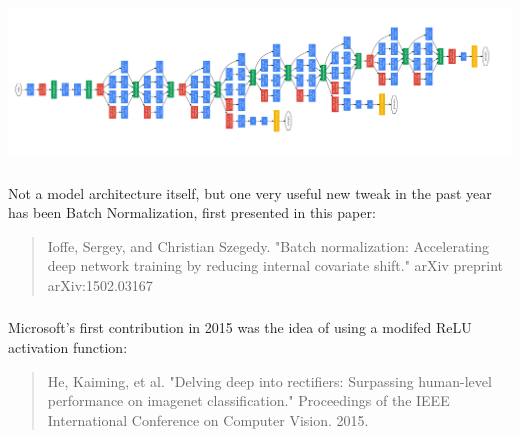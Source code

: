 \documentclass[xetex,mathserif,serif,aspectratio=169]{beamer}
\begin{document}
\begin{frame}[fragile] \frametitle{} \oldB \small

\begin{center}
\includegraphics[width=\textwidth]{img/googlenet_diagram.png}
\end{center}

\end{frame}

\begin{frame}[fragile] \frametitle{} \oldB \small

\textbf{}

\end{frame}

\begin{frame}[fragile] \frametitle{} \oldB \small


Not a model architecture itself, but one very useful new tweak in
the past year has been Batch Normalization, first presented in this
paper:
\begin{quote}
 Ioffe, Sergey, and Christian Szegedy. "Batch normalization: Accelerating deep network training by reducing internal covariate shift." arXiv preprint arXiv:1502.03167
\end{quote}

\end{frame}

\begin{frame}[fragile] \frametitle{} \oldB \small

\textbf{}

\end{frame}

\begin{frame}[fragile] \frametitle{} \oldB \small


Microsoft's first contribution in 2015 was the idea of using
a modifed ReLU activation function:
\begin{quote}
He, Kaiming, et al. "Delving deep into rectifiers: Surpassing human-level performance on imagenet classification." Proceedings of the IEEE International Conference on Computer Vision. 2015.
\end{quote}

\end{frame}
\end{document}
